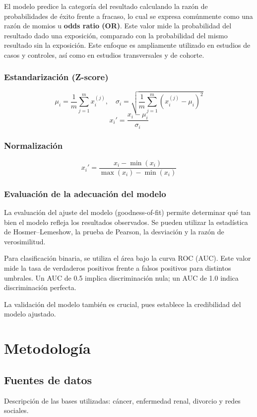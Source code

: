 \documentclass[12pt]{article}
\begin{document}
El modelo predice la categoría del resultado calculando la razón de probabilidades de éxito frente a fracaso, lo cual se expresa comúnmente como una razón de momios u \textbf{odds ratio (OR)}. Este valor mide la probabilidad del resultado dado una exposición, comparado con la probabilidad del mismo resultado sin la exposición. Este enfoque es ampliamente utilizado en estudios de casos y controles, así como en estudios transversales y de cohorte.

\subsubsection*{Estandarización (Z-score)}
\[
\mu_i = \frac{1}{m} \sum_{j=1}^{m} x_i^{(j)}, \quad \sigma_i = \sqrt{\frac{1}{m} \sum_{j=1}^{m} \left( x_i^{(j)} - \mu_i \right)^2}
\]
\[
x_i' = \frac{x_i - \mu_i}{\sigma_i}
\]

\subsubsection*{Normalización}
\[
x_i' = \frac{x_i - \min(x_i)}{\max(x_i) - \min(x_i)}
\]

\subsubsection*{Evaluación de la adecuación del modelo}
La evaluación del ajuste del modelo (goodness-of-fit) permite determinar qué tan bien el modelo refleja los resultados observados. Se pueden utilizar la estadística de Hosmer–Lemeshow, la prueba de Pearson, la desviación y la razón de verosimilitud.

Para clasificación binaria, se utiliza el área bajo la curva ROC (AUC). Este valor mide la tasa de verdaderos positivos frente a falsos positivos para distintos umbrales. Un AUC de 0.5 implica discriminación nula; un AUC de 1.0 indica discriminación perfecta.

La validación del modelo también es crucial, pues establece la credibilidad del modelo ajustado.

\section{Metodología}
\subsection{Fuentes de datos}
Descripción de las bases utilizadas: cáncer, enfermedad renal, divorcio y redes sociales.
\end{document}
